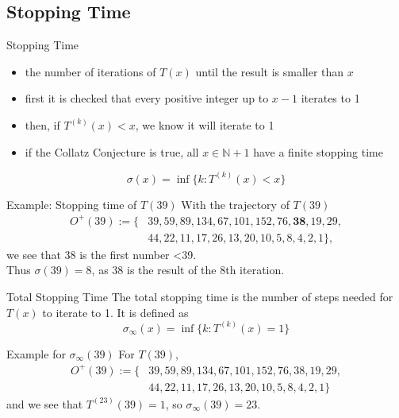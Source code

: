 \documentclass[hyperref={colorlinks,allcolors=black}]{beamer}
\begin{document}

\subsection{Stopping Time}


\begin{frame}{Stopping Time}
\begin{itemize}
    \item the number of iterations of $T(x)$ until the result is smaller
        than $x$
    \item first it is checked that every positive integer up to $x - 1$ 
        iterates to 1
    \item then, if $T^{(k)}(x) < x$, we know it will iterate to 1
    \item if the Collatz Conjecture is true, all $x \in \mathbb{N} + 1$ have
        a finite stopping time
\end{itemize}
\begin{equation}
    \nonumber
    \sigma(x)=\inf\{k:T^{(k)}(x) < x\}
\end{equation}
\end{frame}


\begin{frame}{Example: Stopping time of $T(39)$}
With the trajectory of $T(39)$
\begin{align}
    \nonumber
    O^+(39):=\{&39,59,89,134,67,101,152,76,\textbf{38},19,29,\\
    \nonumber
               &44,22,11,17,26,13,20,10,5,8,4,2,1\},
\end{align}
we see that 38 is the first number <39. \\Thus $\sigma(39) = 8$, as 38
is the result of the 8th iteration.
\end{frame}


\begin{frame}{Total Stopping Time}
The total stopping time is the number of steps needed for $T(x)$ to iterate to 
1. It is defined as
\begin{equation}
    \nonumber
    \sigma_{\infty}(x)=\inf\{k:T^{(k)}(x)=1\} 
\end{equation}
\begin{block}{Example for $\sigma_{\infty}(39)$}
For $T(39)$,
\begin{align}
    \nonumber
    O^+(39):=\{&39,59,89,134,67,101,152,76,38,19,29,\\
    \nonumber
               &44,22,11,17,26,13,20,10,5,8,4,2,1\}
\end{align}
and we see that $T^{(23)}(39)=1$, so $\sigma_{\infty}(39)=23$.
\end{block}
\end{frame}
\end{document}
